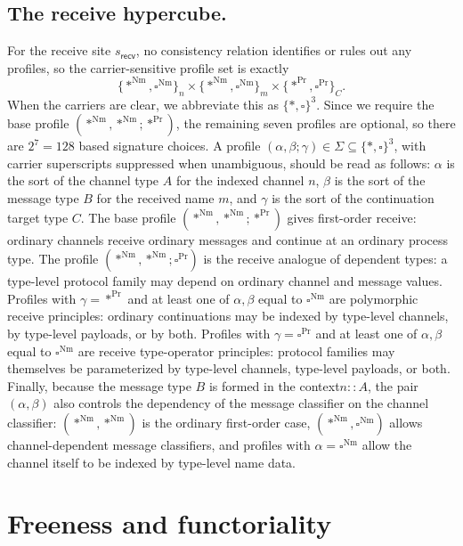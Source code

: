 \documentclass[11pt]{article}
\newcommand{\Proc}{\mathrm{Pr}}
\newcommand{\Nm}{\mathrm{Nm}}
\newcommand{\ty}{\mathrel{::}}
\begin{document}
\subsection{The receive hypercube.}

For the receive site \(s_{\mathsf{recv}}\), no consistency relation identifies
or rules out any profiles, so the carrier-sensitive profile set is exactly
\[
  \{\ast^{\Nm},\square^{\Nm}\}_{n}
  \times
  \{\ast^{\Nm},\square^{\Nm}\}_{m}
  \times
  \{\ast^{\Proc},\square^{\Proc}\}_{C}.
\]
When the carriers are clear, we abbreviate this as \(\{\ast,\square\}^{3}\). Since we require the base profile
\((\ast^{\Nm},\ast^{\Nm};\ast^{\Proc})\), the remaining seven profiles are optional, so there are \(2^7=128\) based signature choices.  A profile \((\alpha,\beta;\gamma)\in \Sigma \subseteq \{\ast,\square\}^{3}\), with carrier superscripts suppressed when unambiguous, should be read as follows: \(\alpha\) is the sort of the channel type \(A\) for the indexed channel \(n\), \(\beta\) is the sort of the message type \(B\) for the received name \(m\), and \(\gamma\) is the sort of the continuation target type \(C\).  The base profile \((\ast^{\Nm},\ast^{\Nm};\ast^{\Proc})\) gives first-order receive: ordinary channels receive ordinary messages and continue at an ordinary process type.  The profile \((\ast^{\Nm},\ast^{\Nm};\square^{\Proc})\) is the receive analogue of dependent types: a type-level protocol family may depend on ordinary channel and message values. Profiles with \(\gamma=\ast^{\Proc}\) and at least one of \(\alpha,\beta\) equal to \(\square^{\Nm}\) are polymorphic receive principles: ordinary continuations may be indexed by type-level channels, by type-level payloads, or by both.  Profiles with \(\gamma=\square^{\Proc}\) and at least one of \(\alpha,\beta\) equal to \(\square^{\Nm}\) are receive type-operator principles: protocol families may themselves be parameterized by type-level channels, type-level payloads, or both.  Finally, because the message type \(B\) is formed in the context\(n\ty A\), the pair \((\alpha,\beta)\) also controls the dependency of the message classifier on the channel classifier: \((\ast^{\Nm},\ast^{\Nm})\) is the ordinary first-order case, \((\ast^{\Nm},\square^{\Nm})\) allows channel-dependent message classifiers, and profiles with \(\alpha=\square^{\Nm}\) allow the channel itself to be indexed by type-level name data.

\section{Freeness and functoriality}
\label{sec:functoriality-adjunction}
\end{document}
